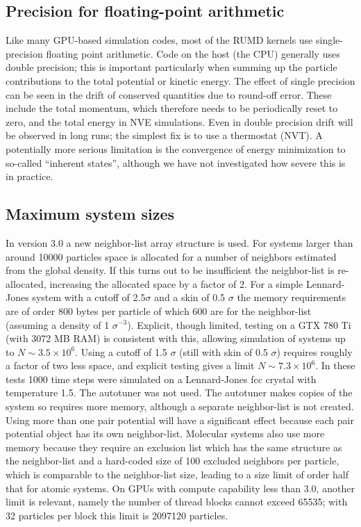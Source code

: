 \documentclass[a4paper]{article}
\begin{document}
\subsection{Precision for floating-point arithmetic}

Like many GPU-based simulation codes, most of the RUMD kernels use 
single-precision floating point arithmetic. Code on the host (the CPU) generally
uses double precision; this is important particularly when summing up the 
particle contributions to the total potential or kinetic energy. The effect of
single precision can be seen in the drift of conserved quantities due to 
round-off error. These include the total momentum, which therefore needs to be 
periodically reset to zero, and the total energy in NVE simulations. Even in 
double precision drift will be observed in long runs; the simplest fix is to
use a thermostat (NVT). A potentially
more serious limitation is the convergence of energy
minimization to so-called ``inherent states'', although we have not investigated
how severe this is in practice.

\subsection{Maximum system sizes}

In version 3.0 a new neighbor-list array structure is used. For systems larger than around 10000 particles space is allocated for a number of neighbors estimated from the global density. If this turns out to be insufficient the neighbor-list is re-allocated, increasing the allocated space by a factor of 2. For a simple Lennard-Jones system with a cutoff of 2.5$\sigma$ and a skin of 0.5 $\sigma$ the memory requirements are of order 800 bytes per particle of which 600 are for the neighbor-list (assuming a density of 1 $\sigma^{-3}$). Explicit, though limited, testing on a GTX 780 Ti (with 3072 MB RAM) is consistent with this, allowing simulation of systems up to $N\sim 3.5\times 10^6$. Using a cutoff of 1.5 $\sigma$ (still with skin of 0.5 $\sigma$) requires roughly a factor of two less space, and explicit testing gives a limit  $N\sim 7.3\times 10^6$.  In these tests 1000 time steps were simulated on a Lennard-Jones fcc crystal with temperature 1.5. The autotuner was not used. The autotuner makes copies of the system so requires more memory, although a separate neighbor-list is not created. Using more than one pair potential will have a significant effect because each pair potential object has its own neighbor-list. Molecular systems also use more memory because they require an exclusion list which has the same structure as the neighbor-list and a hard-coded size of 100 excluded neighbors per particle, which is comparable to the neighbor-list size, leading to a size limit of order half that for atomic systems. On GPUs with compute capability less than 3.0, another limit is relevant, namely the number of thread blocks cannot exceed 65535; with 32 particles per block this limit is 2097120 particles.
\end{document}
